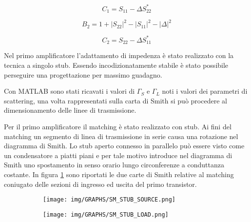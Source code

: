 \documentclass[12pt,oneside]{book}
\begin{document}
\begin{equation}
    C_{1} = S_{11} - \Delta S_{22}^{*}
\end{equation}

\begin{equation}
    B_{2} = 1 + \left|S_{22}\right|^{2} - \left|S_{11}\right|^{2} -\left|\Delta\right|^{2}
\end{equation}

\begin{equation}
    C_{2} = S_{22} - \Delta S_{11}^{*}
\end{equation}



Nel primo amplificatore l'adattamento di impedenza è stato realizzato con la tecnica a singolo stub. Essendo incodizionatamente stabile è stato possibile perseguire una progettazione per massimo guadagno.

Con MATLAB sono stati ricavati i valori di $\Gamma_{S}$ e $\Gamma_{L}$ noti i valori dei parametri di scattering, una volta rappresentati sulla carta di Smith si può procedere al dimensionamento delle linee di trasmissione. 

Per il primo amplificatore il matching è stato realizzato con stub. Ai fini del matching un segmento di linea di trasmissione in serie causa una rotazione nel diagramma di Smith. Lo stub aperto connesso in parallelo può essere visto come un condensatore a piatti piani e per tale motivo introduce nel diagramma di Smith uno spostamento in senso orario lungo circonferenze a conduttanza costante. In figura \ref{stub_match} sono riportati le due carte di Smith relative al matching coniugato delle sezioni di ingresso ed uscita del primo transistor.
\begin{figure}[!htbp]
    \centering
    \begin{subfigure}[t]{0.48\textwidth}
        \centering
        \texttt{[image: img/GRAPHS/SM\_STUB\_SOURCE.png]}
        \caption{}
    \end{subfigure}
    \hfill
    \begin{subfigure}[t]{0.48\textwidth}
        \centering
        \texttt{[image: img/GRAPHS/SM\_STUB\_LOAD.png]}
        \caption{}
    \end{subfigure}
    \caption{}
    \label{stub_match}
\end{figure}
\end{document}
